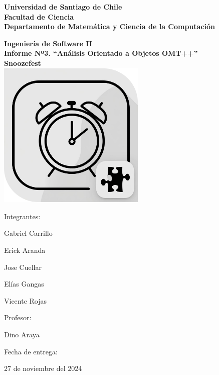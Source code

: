 \begin{titlepage}

\begin{center}
	{\bf Universidad de Santiago de Chile}
	\\
    {\bf Facultad de Ciencia}
	\\
    {\bf Departamento de Matem\'atica y Ciencia de la Computaci\'on}
\end{center}

%

\vfill
\begin{center}
{\large\bf Ingeniería de Software II}
\\
{\Large\bf Informe Nº3. “Análisis Orientado a Objetos OMT++”}\\
\vspace{1cm}
{\Huge\bf Snoozefest}\\
\vspace{2cm}
\includegraphics[height=200pt,width=200pt]{./img/logo.png}
\end{center}
\vfill

%

\begin{flushright}
	\begin{minipage}{0.3\textwidth}
		Integrantes:
		\begin{simplelist}
			\item Gabriel Carrillo
			\item Erick Aranda
			\item Jose Cuellar
			\item Elías Gangas
			\item Vicente Rojas
		\end{simplelist}
	

		Profesor:
		\begin{simplelist}
			\item Dino Araya
		\end{simplelist}
	
		Fecha de entrega:
		\begin{simplelist}
			\item 27 de noviembre del 2024
		\end{simplelist}
	\end{minipage}
\end{flushright}

\end{titlepage}
